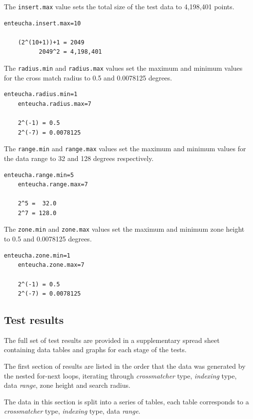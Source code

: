 \documentclass{article}
\newcommand{\crossmatcher} {crossmatcher\xspace}
\begin{document}
The \texttt{insert.max} value sets the total size of the test data to 4,198,401 points.
\begin{lstlisting}[]
    enteucha.insert.max=10

    (2^(10+1))+1 = 2049
          2049^2 = 4,198,401
\end{lstlisting}

The \texttt{radius.min} and \texttt{radius.max} values set the maximum and minimum values for the cross match radius to 0.5 and 0.0078125 degrees.
\begin{lstlisting}[]
    enteucha.radius.min=1
    enteucha.radius.max=7

    2^(-1) = 0.5
    2^(-7) = 0.0078125
\end{lstlisting}

The \texttt{range.min} and \texttt{range.max} values set the maximum and minimum values for the data range to 32 and 128 degrees respectively.
\begin{lstlisting}[]
    enteucha.range.min=5
    enteucha.range.max=7

    2^5 =  32.0
    2^7 = 128.0
\end{lstlisting}

The \texttt{zone.min} and \texttt{zone.max} values set the maximum and minimum zone height to 0.5 and 0.0078125 degrees.
\begin{lstlisting}[]
    enteucha.zone.min=1
    enteucha.zone.max=7

    2^(-1) = 0.5
    2^(-7) = 0.0078125
\end{lstlisting}

\subsection{Test results}
\label{test-results}

The full set of test results are provided in a supplementary spread sheet containing data tables and graphs for each stage of the tests.

The first section of results are listed in the order that the data was generated by the nested for-next loops, iterating through \textit{\crossmatcher} type, \textit{indexing} type, data  \textit{range}, zone height and search radius.

The data in this section is split into a series of tables, each table corresponds to a \textit{\crossmatcher} type, \textit{indexing} type, data  \textit{range}.
\end{document}
